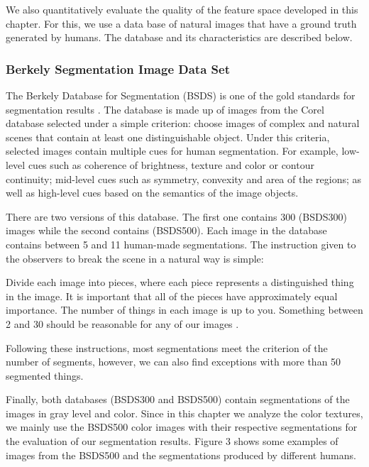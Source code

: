 We also quantitatively evaluate the quality of the feature space developed in this chapter. For this, we use a data base of natural images that have a ground truth generated by humans. The database and its characteristics are described below. 

\subsubsection{Berkely Segmentation Image Data Set}
The Berkely Database for Segmentation (BSDS) is one of the gold standards for segmentation results \citep{Martin.Fowlkes.ea:ICCV:2001}. The database is made up of images from the Corel database selected under a simple criterion: choose images of complex and natural scenes that contain at least one distinguishable object. Under this criteria, selected images contain multiple cues for human segmentation. For example, low-level cues such as coherence of brightness, texture and color or contour continuity; mid-level cues such as symmetry, convexity and area of the regions; as well as high-level cues based on the semantics of the image objects.

There are two versions of this database. The first one contains 300 (BSDS300) images while the second contains (BSDS500). Each image in the database contains between 5 and 11 human-made segmentations. The instruction given to the observers to break the scene in a natural way is simple: 
\begin{displayquote}
Divide each image into pieces, where each piece represents a distinguished thing in the image. It is important that all of the pieces have approximately equal importance. The number of things in each image is up to you. Something between 2 and 30 should be reasonable for any of our images \citep{Martin.Fowlkes.ea:ICCV:2001}.
\end{displayquote}
Following these instructions, most segmentations meet the criterion of the number of segments, however, we can also find exceptions with more than 50 segmented things.

Finally, both databases (BSDS300 and BSDS500) contain segmentations of the images in gray level and color. Since in this chapter we analyze the color textures, we mainly use the BSDS500 color images with their respective segmentations for the evaluation of our segmentation results. Figure 3 shows some examples of images from the BSDS500 and the segmentations produced by different humans.

